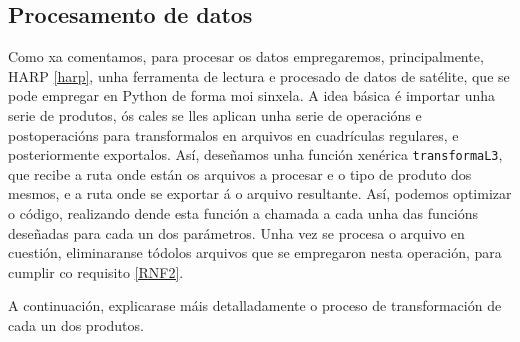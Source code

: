 \subsection{Procesamento de datos}\label{appprocesa}
Como xa comentamos, para procesar os datos empregaremos, principalmente, HARP \ref{harp}, unha ferramenta de lectura e procesado de datos de satélite, que se pode empregar en Python de forma moi
sinxela. A idea básica é importar unha serie de produtos, ós cales se lles aplican unha serie de operacións e postoperacións para transformalos en arquivos en cuadrículas regulares, e
posteriormente exportalos. Así, deseñamos unha función xenérica \texttt{transformaL3}, que recibe a ruta onde están os arquivos a procesar e o tipo de produto dos mesmos, e a ruta onde se exportar
á o arquivo resultante. Así, podemos optimizar o código, realizando dende esta función a chamada a cada unha das funcións deseñadas para cada un dos parámetros. Unha vez se procesa o arquivo en
cuestión, eliminaranse tódolos arquivos que se empregaron nesta operación, para cumplir co requisito \hyperref[rnf2]{[RNF2]}.

A continuación, explicarase máis detalladamente o proceso de transformación de cada un dos produtos.

